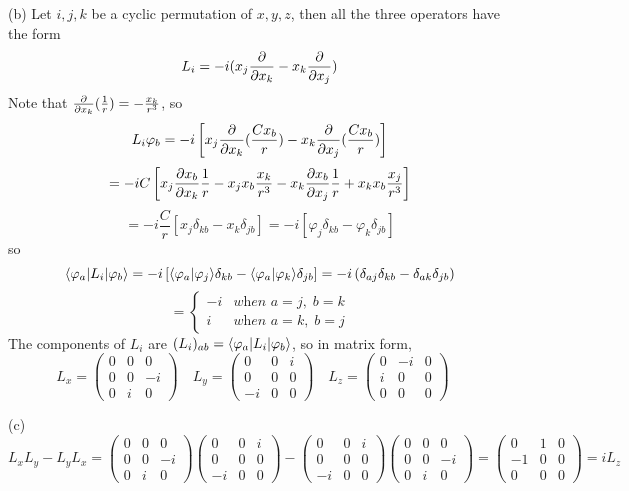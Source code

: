 \documentclass[a4paper]{article}
\begin{document}
(b) Let $i,j,k$ be a cyclic permutation of $x,y,z$, then all the three operators have the form
\[
L_i=-i(x_j\frac{\partial}{\partial x_k}-x_k\frac{\partial}{\partial x_j})
\]
Note that $\frac{\partial}{\partial x_k}(\frac{1}{r})=-\frac{x_k}{r^3}$, so
\[
L_i\varphi_b=-i\left[x_j\frac{\partial}{\partial x_k}(\frac{Cx_b}{r})-x_k\frac{\partial}{\partial x_j}(\frac{Cx_b}{r}) \right]
\]
\[
=-iC\left[x_j\frac{\partial x_b}{\partial x_k}\frac{1}{r}-x_jx_b\frac{x_k}{r^3}-x_k\frac{\partial x_b}{\partial x_j}\frac{1}{r}+x_kx_b\frac{x_j}{r^3} \right]
\]
\[
=-i\frac{C}{r}\left[x_j\delta_{kb}-x_k\delta_{jb} \right]=-i\left[\varphi_j\delta_{kb}-\varphi_k\delta_{jb} \right]
\]
so
\[
\langle\varphi_a|L_i|\varphi_b\rangle=-i\left[\langle\varphi_a|\varphi_j\rangle\delta_{kb}-\langle\varphi_a|\varphi_k\rangle\delta_{jb} \right]=-i\left(\delta_{aj}\delta_{kb}-\delta_{ak}\delta_{jb} \right)
\]
\[
=
\begin{cases}
-i & \textit{when $a=j,\;b=k$}\\
i & \textit{when $a=k,\;b=j$}
\end{cases}
\]
The components of $L_i$ are $(L_i)_{ab}=\langle\varphi_a|L_i|\varphi_b\rangle$, so in matrix form,
\[
L_x=
\begin{pmatrix}
0&0&0\\
0&0&-i\\
0&i&0
\end{pmatrix}\quad
L_y=
\begin{pmatrix}
0&0&i\\
0&0&0\\
-i&0&0
\end{pmatrix}\quad
L_z=
\begin{pmatrix}
0&-i&0\\
i&0&0\\
0&0&0
\end{pmatrix}\quad
\]

(c)
\[
L_xL_y-L_yL_x=
\begin{pmatrix}
0&0&0\\
0&0&-i\\
0&i&0
\end{pmatrix}
\begin{pmatrix}
0&0&i\\
0&0&0\\
-i&0&0
\end{pmatrix}-
\begin{pmatrix}
0&0&i\\
0&0&0\\
-i&0&0
\end{pmatrix}
\begin{pmatrix}
0&0&0\\
0&0&-i\\
0&i&0
\end{pmatrix}=
\begin{pmatrix}
0&1&0\\
-1&0&0\\
0&0&0
\end{pmatrix}=iL_z
\]
\medskip
\end{document}
